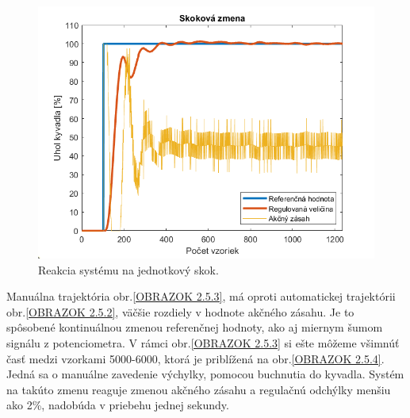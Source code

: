 \begin{figure}[!tbh]
	\centering
	\includegraphics[width=\textwidth]{obr/SkokovaZmena.png}
	\caption{Reakcia systému na jednotkový skok.}\label{OBRAZOK 2.5.1}
\end{figure}

Manuálna trajektória obr.\ref{OBRAZOK 2.5.3}, má oproti automatickej trajektórii obr.\ref{OBRAZOK 2.5.2}, väčšie rozdiely v hodnote akčného zásahu. Je to spôsobené kontinuálnou zmenou referenčnej hodnoty, ako aj miernym šumom signálu z potenciometra. V rámci obr.\ref{OBRAZOK 2.5.3} si ešte môžeme všimnúť časť medzi vzorkami 5000-6000, ktorá je priblížená na obr.\ref{OBRAZOK 2.5.4}. Jedná sa o manuálne zavedenie výchylky, pomocou buchnutia do kyvadla. Systém na takúto zmenu reaguje zmenou akčného zásahu a regulačnú odchýlky menšiu ako 2\%, nadobúda v priebehu jednej sekundy. 

